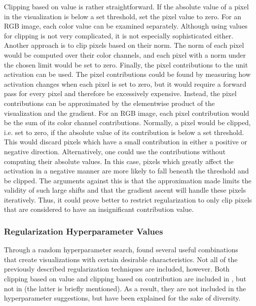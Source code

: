 \noindent Clipping based on value is rather straightforward. If the absolute value of a pixel in the visualization is below a set threshold, set the pixel value to zero. For an RGB image, each color value can be examined separately. Although using values for clipping is not very complicated, it is not especially sophisticated either. Another approach is to clip pixels based on their norm. The norm of each pixel would be computed over their color channels, and each pixel with a norm under the chosen limit would be set to zero. Finally, the pixel contributions to the unit activation can be used. The pixel contributions could be found by measuring how activation changes when each pixel is set to zero, but it would require a forward pass for every pixel and therefore be excessively expensive. Instead, the pixel contributions can be approximated by the elementwise product of the visualization and the gradient. For an RGB image, each pixel contribution would be the sum of its color channel contributions. Normally, a pixel would be clipped, i.e. set to zero, if the absolute value of its contribution is below a set threshold. This would discard pixels which have a small contribution in either a positive or negative direction. Alternatively, one could use the contributions without computing their absolute values. In this case, pixels which greatly affect the activation in a negative manner are more likely to fall beneath the threshold and be clipped. The arguments against this is that the approximation made limits the validity of such large shifts and that the gradient ascent will handle these pixels iteratively. Thus, it could prove better to restrict regularization to only clip pixels that are considered to have an insignificant contribution value. 

\subsubsection{Regularization Hyperparameter Values}

Through a random hyperparameter search, \cite{deepvis} found several useful combinations that create visualizations with certain desirable characteristics. Not all of the previously described regularization techniques are included, however. Both clipping based on value and clipping based on contribution are included in \cite{deepvis-web-article}, but not in \cite{deepvis} (the latter is briefly mentioned). As a result, they are not included in the hyperparameter suggestions, but have been explained for the sake of diversity. \\

